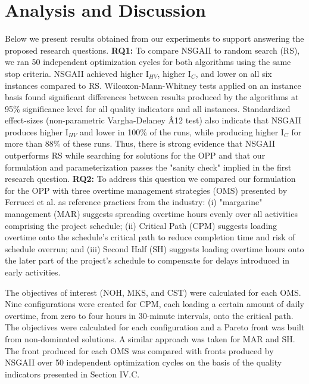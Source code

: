 \documentclass[conference]{IEEEtran}
\begin{document}
\section{Analysis and Discussion}
Below we present results obtained from our experiments to support answering the proposed research questions. \linebreak
\textbf{RQ1:} To compare NSGAII to random search (RS), we ran 50 independent optimization cycles for both algorithms using the same stop criteria. NSGAII achieved higher I$_{HV}$, higher I$_{C}$, and lower  on all six instances compared to RS. Wilcoxon-Mann-Whitney tests applied on an instance basis found significant differences between results produced by the algorithms at 95\% significance level for all quality indicators and all instances. Standardized effect-sizes (non-parametric Vargha-Delaney Â12 test) also indicate that NSGAII produces higher I$_{HV}$ and lower  in 100\% of the runs, while producing higher I$_{C}$ for more than 88\% of these runs. Thus, there is strong evidence that NSGAII outperforms RS while searching for solutions for the OPP and that our formulation and parameterization passes the "sanity check" implied in the first research question.\linebreak
\textbf{RQ2:} To address this question we compared our formulation for the OPP with three overtime management strategies (OMS) presented by Ferrucci et al. \cite{Ferrucci:2013} as reference practices from the industry: (i) "margarine" management (MAR) suggests spreading overtime hours evenly over all activities comprising the project schedule; (ii) Critical Path (CPM) suggests loading overtime onto the schedule's critical path to reduce completion time and risk of schedule overrun; and (iii) Second Half (SH) suggests loading overtime hours onto the later part of the project's schedule to compensate for delays introduced in early activities. 

The objectives of interest (NOH, MKS, and CST) were calculated for each OMS. Nine configurations were created for CPM, each loading a certain amount of daily overtime, from zero to four hours in 30-minute intervals, onto the critical path. The objectives were calculated for each configuration and a Pareto front was built from non-dominated solutions. A similar approach was taken for MAR and SH. The front produced for each OMS was compared with fronts produced by NSGAII over 50 independent optimization cycles on the basis of the quality indicators presented in Section IV.C.
\end{document}
